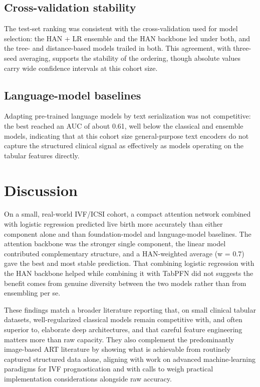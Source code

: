 \documentclass[12pt,a4paper]{article}
\begin{document}
\subsection*{Cross-validation stability}

The test-set ranking was consistent with the cross-validation used for model selection: the HAN + LR ensemble and the HAN backbone led under both, and the tree- and distance-based models trailed in both. This agreement, with three-seed averaging, supports the stability of the ordering, though absolute values carry wide confidence intervals at this cohort size.

\subsection*{Language-model baselines}

Adapting pre-trained language models by text serialization was not competitive: the best reached an AUC of about 0.61, well below the classical and ensemble models, indicating that at this cohort size general-purpose text encoders do not capture the structured clinical signal as effectively as models operating on the tabular features directly.

\section*{Discussion}

On a small, real-world IVF/ICSI cohort, a compact attention network combined with logistic regression predicted live birth more accurately than either component alone and than foundation-model and language-model baselines. The attention backbone was the stronger single component, the linear model contributed complementary structure, and a HAN-weighted average (w = 0.7) gave the best and most stable prediction. That combining logistic regression with the HAN backbone helped while combining it with TabPFN did not suggests the benefit comes from genuine diversity between the two models rather than from ensembling per se.

These findings match a broader literature reporting that, on small clinical tabular datasets, well-regularized classical models remain competitive with, and often superior to, elaborate deep architectures,\cite{tabpfnNat,benchmark} and that careful feature engineering matters more than raw capacity. They also complement the predominantly image-based ART literature\cite{mina,theilgaard,louis} by showing what is achievable from routinely captured structured data alone, aligning with work on advanced machine-learning paradigms for IVF prognostication\cite{catalyzing} and with calls to weigh practical implementation considerations alongside raw accuracy.\cite{swain}
\end{document}
